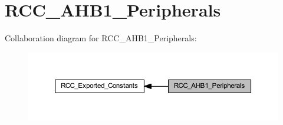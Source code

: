 \hypertarget{group___r_c_c___a_h_b1___peripherals}{}\section{R\+C\+C\+\_\+\+A\+H\+B1\+\_\+\+Peripherals}
\label{group___r_c_c___a_h_b1___peripherals}
Collaboration diagram for R\+C\+C\+\_\+\+A\+H\+B1\+\_\+\+Peripherals\+:
\nopagebreak
\begin{figure}[H]
\begin{center}
\leavevmode
\includegraphics[width=350pt]{group___r_c_c___a_h_b1___peripherals}
\end{center}
\end{figure}
